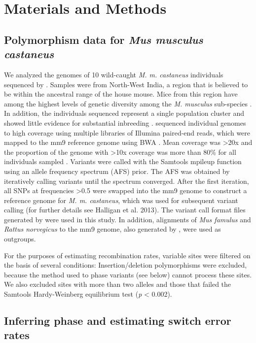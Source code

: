 \section{Materials and Methods}

\subsection{Polymorphism data for \emph{Mus musculus castaneus}}
 
        	We analyzed the genomes of 10 wild-caught \emph{M. m. castaneus} individuals sequenced by \cite{RN122}. Samples were from North-West India, a region that is believed to be within the ancestral range of the house mouse. Mice from this region have among the highest levels of genetic diversity among the \textit{M. musculus} sub-species \citep{RN233}. In addition, the individuals sequenced represent a single population cluster and showed little evidence for substantial inbreeding \cite{RN158}. \citep{RN122} sequenced individual genomes to high coverage using multiple libraries of Illumina paired-end reads, which were mapped to the mm9 reference genome using BWA \citep{RN251}. Mean coverage was >20x and the proportion of the genome with >10x coverage was more than 80\% for all individuals sampled \citep{RN122}. Variants were called with the Samtools mpileup function \citep{RN252} using an allele frequency spectrum (AFS) prior. The AFS was obtained by iteratively calling variants until the spectrum converged. After the first iteration, all SNPs at frequencies >0.5 were swapped into the mm9 genome to construct a reference genome for \emph{M. m. castaneus}, which was used for subsequent variant calling (for further details see Halligan et al. 2013). The variant call format files generated by \cite{RN122} were used in this study. In addition, alignments of \emph{Mus famulus} and \emph{Rattus norvegicus} to the mm9 genome, also generated by \cite{RN122}, were used as outgroups.
 
        	For the purposes of estimating recombination rates, variable sites were filtered on the basis of several conditions: Insertion/deletion polymorphisms were excluded, because the method used to phase variants (see below) cannot process these sites. We also excluded sites with more than two alleles and those that failed the Samtools Hardy-Weinberg equilibrium test (\emph{p} < 0.002).
 
\subsection{Inferring phase and estimating switch error rates}
 
